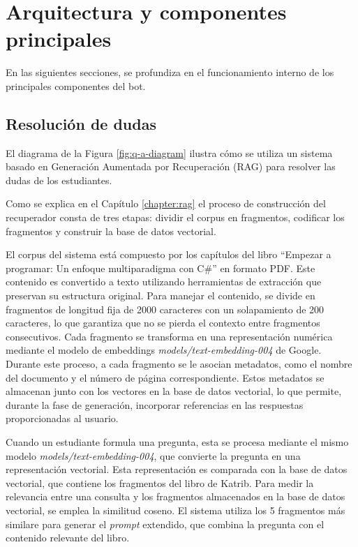 \documentclass{article}
\begin{document}
\section{Arquitectura y componentes principales}

En las siguientes secciones, se profundiza en el funcionamiento interno de los principales componentes del bot.

\subsection{Resolución de dudas}

El diagrama de la Figura \ref{fig:q-a-diagram} ilustra cómo se utiliza un sistema basado en Generación Aumentada por Recuperación (RAG) para resolver las dudas de los estudiantes.

Como se explica en el Capítulo \ref{chapter:rag} el proceso de construcción del recuperador consta de tres etapas: dividir el corpus en fragmentos, codificar los fragmentos y construir la base de datos vectorial.

El corpus del sistema está compuesto por los capítulos del libro ``Empezar a programar: Un enfoque multiparadigma con C\#'' en formato PDF. Este contenido es convertido a texto utilizando herramientas de extracción que preservan su estructura original. Para manejar el contenido, se divide en fragmentos de longitud fija de 2000 caracteres con un solapamiento de 200 caracteres, lo que garantiza que no se pierda el contexto entre fragmentos consecutivos. Cada fragmento se transforma en una representación numérica mediante el modelo de embeddings \textit{models/text-embedding-004} de Google. Durante este proceso, a cada fragmento se le asocian metadatos, como el nombre del documento y el número de página correspondiente. Estos metadatos se almacenan junto con los vectores en la base de datos vectorial, lo que permite, durante la fase de generación, incorporar referencias en las respuestas proporcionadas al usuario.

Cuando un estudiante formula una pregunta, esta se procesa mediante el mismo modelo \textit{models/text-embedding-004}, que convierte la pregunta en una representación vectorial. Esta representación es comparada con la base de datos vectorial, que contiene los fragmentos del libro de Katrib. Para medir la relevancia entre una consulta y los fragmentos almacenados en la base de datos vectorial, se emplea la similitud coseno. El sistema utiliza los 5 fragmentos más similare para generar el \textit{prompt} extendido, que combina la pregunta con el contenido relevante del libro.
\end{document}
